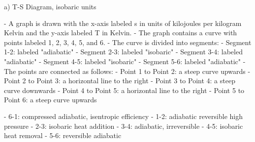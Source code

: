 a) T-S Diagram, isobaric units

- A graph is drawn with the x-axis labeled s in units of kilojoules per kilogram Kelvin and the y-axis labeled T in Kelvin.
- The graph contains a curve with points labeled 1, 2, 3, 4, 5, and 6.
- The curve is divided into segments:
  - Segment 1-2: labeled "adiabatic"
  - Segment 2-3: labeled "isobaric"
  - Segment 3-4: labeled "adiabatic"
  - Segment 4-5: labeled "isobaric"
  - Segment 5-6: labeled "adiabatic"
- The points are connected as follows:
  - Point 1 to Point 2: a steep curve upwards
  - Point 2 to Point 3: a horizontal line to the right
  - Point 3 to Point 4: a steep curve downwards
  - Point 4 to Point 5: a horizontal line to the right
  - Point 5 to Point 6: a steep curve upwards

- 6-1: compressed adiabatic, isentropic efficiency
- 1-2: adiabatic reversible high pressure
- 2-3: isobaric heat addition
- 3-4: adiabatic, irreversible
- 4-5: isobaric heat removal
- 5-6: reversible adiabatic